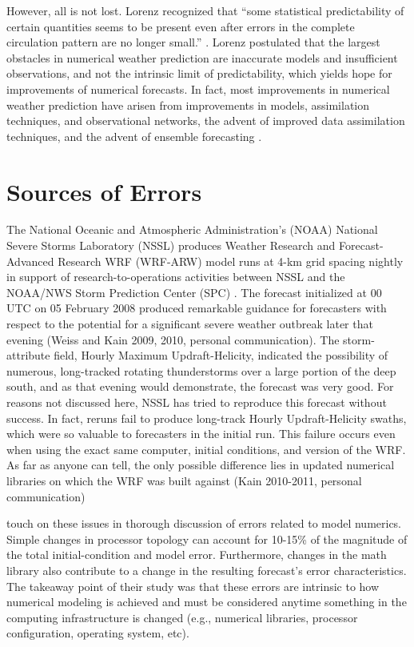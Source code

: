 However, all is not lost. Lorenz recognized that ``some statistical predictability of certain quantities seems to be present even after errors in the complete circulation pattern are no longer small.'' \citep{lorenz1965predictability}. Lorenz postulated that the largest obstacles in numerical weather prediction are inaccurate models and insufficient observations, and not the intrinsic limit of predictability, which yields hope for improvements of numerical forecasts. In fact, most improvements in numerical weather prediction have arisen from improvements in models, assimilation techniques, and observational networks, the advent of improved data assimilation techniques, and the advent of ensemble forecasting \citep{shukla2005predictability}.




\section{Sources of Errors}

The National Oceanic and Atmospheric Administration's (NOAA) National Severe Storms Laboratory (NSSL) produces Weather Research and Forecast-Advanced Research WRF (WRF-ARW) model runs at 4-km grid spacing nightly in support of research-to-operations activities between NSSL and the NOAA/NWS Storm Prediction Center (SPC) \citep{kain2010attributes}. The forecast initialized at 00 UTC on 05 February 2008 produced remarkable guidance for forecasters with respect to the potential for a significant severe weather outbreak later that evening (Weiss and Kain 2009, 2010, personal communication). The storm-attribute field, Hourly Maximum Updraft-Helicity, indicated the possibility of numerous, long-tracked rotating thunderstorms over a large portion of the deep south, and as that evening would demonstrate, the forecast was very good. For reasons not discussed here, NSSL has tried to reproduce this forecast without success. In fact, reruns fail to produce long-track Hourly Updraft-Helicity swaths, which were so valuable to forecasters in the initial run. This failure occurs even when using the exact same computer, initial conditions, and version of the WRF. As far as anyone can tell, the only possible difference lies in updated numerical libraries on which the WRF was built against (Kain 2010-2011, personal communication)


\cite{thomas2002floatingpoint} touch on these issues in thorough discussion of errors related to model numerics. Simple changes in processor topology can account for 10-15\% of the magnitude of the total initial-condition and model error. Furthermore, changes in the math library also contribute to a change in the resulting forecast's error characteristics. The takeaway point of their study was that these errors are intrinsic to how numerical modeling is achieved and must be considered anytime something in the computing infrastructure is changed (e.g., numerical libraries, processor configuration, operating system, etc).


